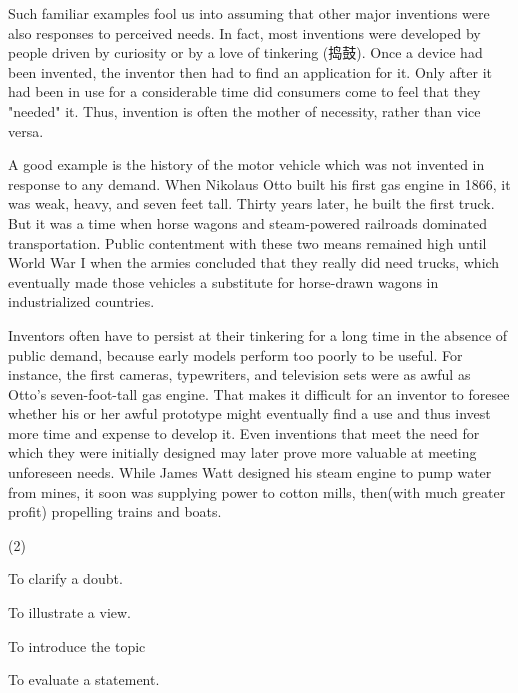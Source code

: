 \documentclass{英语试卷}
\begin{document}
\par Such familiar examples fool us into assuming that other major inventions were also responses to perceived needs. In fact, most inventions were developed by people driven by curiosity or by a love of tinkering (捣鼓). Once a device had been invented, the inventor then had to find an application for it. Only after it had been in use for a considerable time did consumers come to feel that they "needed" it. Thus, invention is often the mother of necessity, rather than vice versa.\par
\par A good example is the history of the motor vehicle which was not invented in response to any demand. When Nikolaus Otto built his first gas engine in 1866, it was weak, heavy, and seven feet tall. Thirty years later, he built the first truck. But it was a time when horse wagons and steam-powered railroads dominated transportation. Public contentment with these two means remained high until World War I when the armies concluded that they really did need trucks, which eventually made those vehicles a substitute for horse-drawn wagons in industrialized countries.\par
\par Inventors often have to persist at their tinkering for a long time in the absence of public demand, because early models perform too poorly to be useful. For instance, the first cameras, typewriters, and television sets were as awful as Otto's seven-foot-tall gas engine. That makes it difficult for an inventor to foresee whether his or her awful prototype might eventually find a use and thus invest more time and expense to develop it. Even inventions that meet the need for which they were initially designed may later prove more valuable at meeting unforeseen needs. While James Watt designed his steam engine to pump water from mines, it soon was supplying power to cotton mills, then(with much greater profit) propelling trains and boats.\par
{}
\begin{choices}(2)
  \item To clarify a doubt.
  \item To illustrate a view.
  \item To introduce the topic
  \item To evaluate a statement.
\end{choices}
\end{document}
